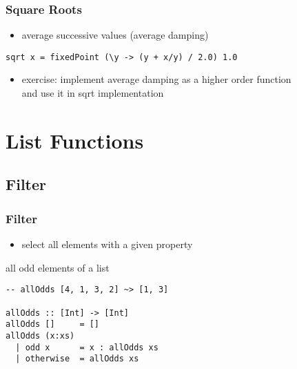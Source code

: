 \documentclass[dvipsnames]{beamer}
\theoremstyle{plain}
\begin{document}
\begin{frame}[fragile]
  \frametitle{Square Roots}

  \begin{itemize}
    \item average successive values (average damping)
  \end{itemize}

  \begin{exampleblock}{}
    \begin{lstlisting}[deletekeywords={sqrt}]
sqrt x = fixedPoint (\y -> (y + x/y) / 2.0) 1.0
    \end{lstlisting}
  \end{exampleblock}

  \pause
  \begin{itemize}
    \item exercise: implement average damping as a higher order function\\
      and use it in sqrt implementation
  \end{itemize}
\end{frame}

\section{List Functions}

\subsection{Filter}

\begin{frame}[fragile]
  \frametitle{Filter}

  \begin{itemize}
    \item select all elements with a given property
  \end{itemize}

  \begin{exampleblock}{all odd elements of a list}
    \begin{lstlisting}
-- allOdds [4, 1, 3, 2] ~> [1, 3]

allOdds :: [Int] -> [Int]
allOdds []     = []
allOdds (x:xs)
  | odd x      = x : allOdds xs
  | otherwise  = allOdds xs
    \end{lstlisting}
  \end{exampleblock}
\end{frame}
\end{document}
